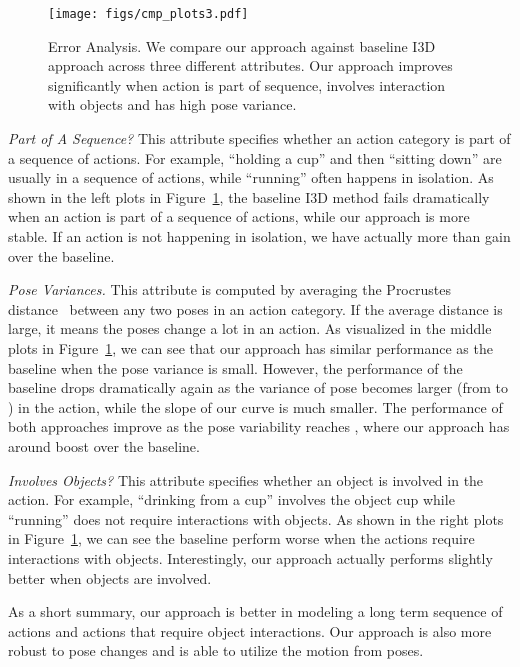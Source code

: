 \documentclass[runningheads]{llncs}
\begin{document}
\begin{figure}[t]
\centering
\texttt{[image: figs/cmp\_plots3.pdf]}
\vspace{-1.2em}
\caption{Error Analysis. We compare our approach against baseline I3D approach across three different attributes. Our approach improves significantly when action is part of sequence, involves interaction with objects and has high pose variance. }
\label{fig:error}
\vspace{-1em}
\end{figure}


\emph{Part of A Sequence?} This attribute specifies whether an action category is part of a sequence of actions. For example, ``holding a cup'' and then ``sitting down'' are usually in a sequence of actions, while ``running'' often happens in isolation. As shown in the left plots in Figure~\ref{fig:error}, the baseline I3D method fails dramatically when an action is part of a sequence of actions, while our approach is more stable.  If an action is not happening in isolation, we have actually more than  gain over the baseline.   


\emph{Pose Variances.} This attribute is computed by averaging the Procrustes distance~\cite{kendall1989survey} between any two poses in an action category. If the average distance is large, it means the poses change a lot in an action. As visualized in the middle plots in Figure~\ref{fig:error}, we can see that our approach has similar performance as the baseline when the pose variance is small. However, the performance of the baseline drops dramatically again as the variance of pose becomes larger (from  to ) in the action, while the slope of our curve is much smaller. The performance of both approaches improve as the pose variability reaches , where our approach has  around  boost over the baseline.  


\emph{Involves Objects?} This attribute specifies whether an object is involved in the action. For example, ``drinking from a cup'' involves the object cup while ``running'' does not require interactions with objects. As shown in the right plots in Figure~\ref{fig:error}, we can see the baseline perform worse when the actions require interactions with objects.  Interestingly, our approach actually performs slightly better when objects are involved. 

As a short summary, our approach is better in modeling a long term sequence of actions and actions that require object interactions. Our approach is also more robust to pose changes and is able to utilize the motion from poses. 
\end{document}
